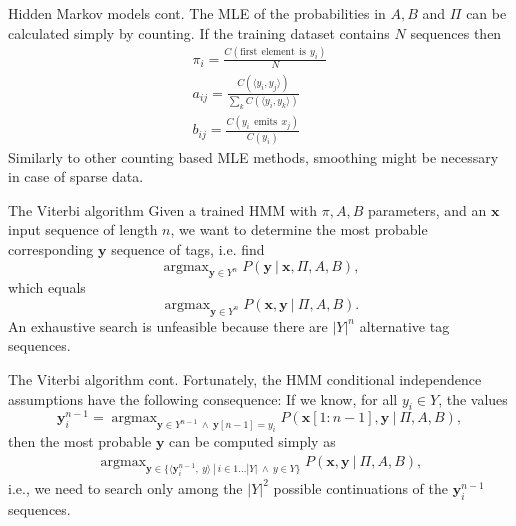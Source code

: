 \documentclass[style=upen, size=14pt]{powerdot}
\DeclareMathOperator*{\argmax}{argmax}
\theoremstyle{definition}
\begin{document}
  \begin{slide}[toc=]{Hidden Markov models cont.} The MLE of the probabilities
    in $A, B$ and $\Pi$ can be calculated simply by counting. If the training
    dataset contains $N$ sequences then
    \begin{gather*} \pi_i = \frac{C(\mathrm{first~~element~~is~~}
        y_i)}{N}\\ a_{ij} = \frac{C(\langle y_i,y_j\rangle)}{\sum_kC(\langle
        y_i,y_k\rangle)}\\ b_{ij} = \frac{C(y_i \mathrm{~~emits~~} x_j)}{C(y_i)}
    \end{gather*}
    Similarly to other counting based MLE methods, smoothing might be necessary
    in case of sparse data.
  \end{slide}

  \begin{slide}[toc=Viterbi]{The Viterbi algorithm}
    Given a trained HMM with $\pi, A, B$ parameters, and an $\mathbf{x}$
    input sequence of length $n$, we want to determine the most probable corresponding
    $\mathbf{y}$ sequence of tags, i.e. find
    $$
    \argmax_{\mathbf{y}\in Y^n} P(\mathbf{y} ~|~ \mathbf{x}, \Pi, A, B),
    $$
    which equals
    $$
    \argmax_{\mathbf{y}\in Y^n} P(\mathbf{x}, \mathbf{y} ~|~ \Pi, A, B).
    $$
    An exhaustive search is unfeasible because there are $|Y|^n$ alternative tag
    sequences.
  \end{slide}
  
  \begin{slide}[toc=]{The Viterbi algorithm cont.}
    Fortunately, the HMM conditional independence assumptions have the following
    consequence: If we know, for all $y_i\in Y$, the values
    $$
    \mathbf{y}^{n-1}_i = \argmax_{\mathbf{y}\in Y^{n-1}~\wedge~\mathbf{y}[n-1] = y_i}
    P(\mathbf{x}[1:n-1], \mathbf{y} ~|~ \Pi, A, B),
    $$
    then the most probable $\mathbf{y}$ can be computed simply as 
    \begin{gather*}
      \argmax_{\mathbf{y}\in \{\langle \mathbf{y}_i^{n-1},~y \rangle ~|~ i \in 1\dots |Y|~\wedge~ y \in Y\}} P(\mathbf{x}, \mathbf{y} ~|~ \Pi, A, B),
    \end{gather*}
    i.e., we need to search only among the $|Y|^2$ possible continuations of the
    $\mathbf{y}^{n-1}_i$ sequences.
  \end{slide}
\end{document}
